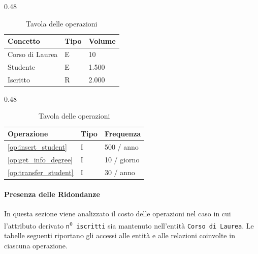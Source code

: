 \documentclass[a4paper,11pt]{article}
\begin{document}
\begin{table}[H]
    \centering
    
    \begin{subtable}{0.48\textwidth}
        \centering
        \begin{tabular}{l l l }
            \toprule
            \textbf{Concetto} & \textbf{Tipo} & \textbf{Volume} \\
            \midrule
            Corso di Laurea & E & 10 \\
            Studente & E & 1.500 \\
            Iscritto & R & 2.000 \\
            \bottomrule
        \end{tabular}
        \caption{Tabella dei volumi}
        \label{tab:redundancy_volumes}
    \end{subtable}
    \hfill
    \begin{subtable}{0.48\textwidth}
        \centering
        \begin{tabular}{l l l }
            \toprule
            \textbf{Operazione} & \textbf{Tipo} & \textbf{Frequenza} \\
            \midrule
            \ref{op:insert_student} & I & 500 / anno \\
            \ref{op:get_info_degree} & I & 10 / giorno \\
            \ref{op:transfer_student} & I & 30 / anno \\
            \bottomrule
        \end{tabular}
        \caption{Tavola delle operazioni}
        \label{tab:redundancy_operations}
    \end{subtable}
\end{table}


\paragraph{Presenza delle Ridondanze}

In questa sezione viene analizzato il costo delle operazioni nel caso in cui l'attributo derivato \texttt{n\textsuperscript{o} iscritti} sia mantenuto nell'entità \texttt{Corso di Laurea}. Le tabelle seguenti riportano gli accessi alle entità e alle relazioni coinvolte in ciascuna operazione.
\end{document}
